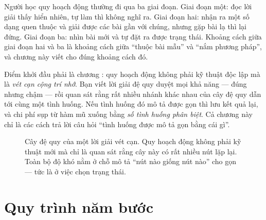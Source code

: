 \documentclass[../../algorithm.tex]{subfiles}
\begin{document}
Người học quy hoạch động thường đi qua ba giai đoạn. Giai đoạn một: đọc lời giải thấy hiển nhiên, tự làm thì không nghĩ ra. Giai đoạn hai: nhận ra một số dạng quen thuộc và giải được các bài gần với chúng, nhưng gặp bài lạ thì lại đứng. Giai đoạn ba: nhìn bài mới và tự đặt ra được trạng thái. Khoảng cách giữa giai đoạn hai và ba là khoảng cách giữa ``thuộc bài mẫu'' và ``nắm phương pháp'', và chương này viết cho đúng khoảng cách đó.

Điểm khởi đầu phải là chương : quy hoạch động không phải kỹ thuật độc lập mà là \emph{vét cạn cộng trí nhớ}. Bạn viết lời giải đệ quy duyệt mọi khả năng --- đúng nhưng chậm --- rồi quan sát rằng rất nhiều nhánh khác nhau của cây đệ quy dẫn tới cùng một tình huống. Nếu tình huống đó mô tả được gọn thì lưu kết quả lại, và chi phí sụp từ hàm mũ xuống bằng \emph{số tình huống phân biệt}. Cả chương này chỉ là các cách trả lời câu hỏi ``tình huống được mô tả gọn bằng cái gì''.

\begin{figure}[H]\centering
{}
\caption{Cây đệ quy của một lời giải vét cạn. Quy hoạch động không phải kỹ thuật mới mà chỉ là quan sát rằng cây này có rất nhiều nút lặp lại. Toàn bộ độ khó nằm ở chỗ mô tả ``nút nào giống nút nào'' cho gọn --- tức là ở việc chọn trạng thái.}
\label{fig:dp-overlap}
\end{figure}

\section{Quy trình năm bước}
\end{document}
